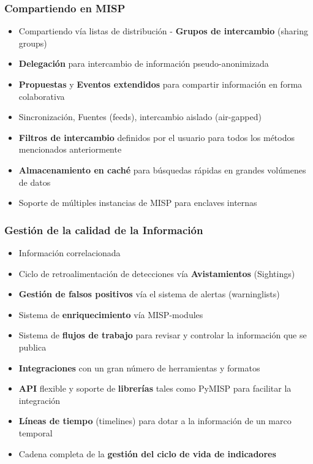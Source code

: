 \begin{frame}
\frametitle{Compartiendo en MISP}
    \begin{itemize}
        \item Compartiendo vía listas de distribución - {\bf Grupos de intercambio} (sharing groups)
        \item {\bf Delegación} para intercambio de información pseudo-anonimizada
        \item {\bf Propuestas} y {\bf Eventos extendidos} para compartir información en forma colaborativa
        \item Sincronización, Fuentes (feeds), intercambio aislado (air-gapped)
        \item {\bf Filtros de intercambio } definidos por el usuario para todos los métodos mencionados anteriormente
        \item {\bf Almacenamiento en caché} para búsquedas rápidas en grandes volúmenes de datos
        \item Soporte de múltiples instancias de MISP para enclaves internas
    \end{itemize}
\end{frame}

\begin{frame}
\frametitle{Gestión de la calidad de la Información}
    \begin{itemize}
        \item Información correlacionada
        \item Ciclo de retroalimentación de detecciones vía {\bf Avistamientos} (Sightings)
        \item {\bf Gestión de falsos positivos} vía el sistema de alertas (warninglists)
        \item Sistema de {\bf enriquecimiento} vía MISP-modules
        \item Sistema de {\bf flujos de trabajo} para revisar y controlar la información que se publica
        \item {\bf Integraciones} con un gran número de herramientas y formatos
        \item {\bf API} flexible y soporte de {\bf librerías} tales como PyMISP para facilitar la integración
        \item {\bf Líneas de tiempo} (timelines) para dotar a la información de un marco temporal
        \item Cadena completa de la {\bf gestión del ciclo de vida de indicadores}
    \end{itemize}
\end{frame}

